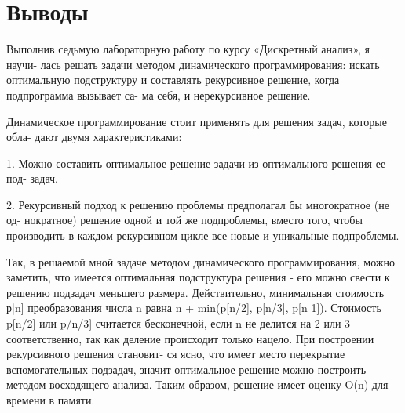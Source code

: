 \section{Выводы}

Выполнив седьмую лабораторную работу по курсу «Дискретный анализ», я научи-
лась решать задачи методом динамического программирования: искать оптимальную
подструктуру и составлять рекурсивное решение, когда подпрограмма вызывает са-
ма себя, и нерекурсивное решение.\newline

Динамическое программирование стоит применять для решения задач, которые обла-
дают двумя характеристиками:\newline

1. Можно составить оптимальное решение задачи из оптимального решения ее под-
задач.\newline

2. Рекурсивный подход к решению проблемы предполагал бы многократное (не од-
нократное) решение одной и той же подпроблемы, вместо того, чтобы производить
в каждом рекурсивном цикле все новые и уникальные подпроблемы.\newline

Так, в решаемой мной задаче методом динамического программирования, можно
заметить, что имеется оптимальная подструктура решения - его можно свести к
решению подзадач меньшего размера. Действительно, минимальная стоимость р|n]
преобразования числа n равна n + min(p[n/2], p[n/3], p[n 1]). Стоимость p[n/2] или
p/n/3] считается бесконечной, если n не делится на 2 или 3 соответственно, так как
деление происходит только нацело. При построении рекурсивного решения становит-
ся ясно, что имеет место перекрытие вспомогательных подзадач, значит оптимальное
решение можно построить методом восходящего анализа. Таким образом, решение
имеет оценку O(n) для времени в памяти.\newline

\pagebreak
